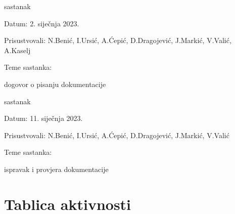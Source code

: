 \begin{packed_enum}
	   \eject
	
	   \item  sastanak
				\item[] \begin{packed_item}
					\item Datum: 2. siječnja 2023.
					\item Prisustvovali: N.Benić, I.Ursić, A.Ćepić, D.Dragojević, J.Markić, V.Valić, A.Kaselj 
					\item Teme sastanka:
					\begin{packed_item}
						\item  dogovor o pisanju dokumentacije
					\end{packed_item}
				\end{packed_item}
	
		\item  sastanak
				\item[] \begin{packed_item}
					\item Datum: 11. siječnja 2023.
					\item Prisustvovali: N.Benić, I.Ursić, A.Ćepić, D.Dragojević, J.Markić, V.Valić 
					\item Teme sastanka:
					\begin{packed_item}
						\item  ispravak i provjera dokumentacije
					\end{packed_item}
				\end{packed_item}
				
				
			\end{packed_enum}
			
			\eject
			\section*{Tablica aktivnosti}
	
